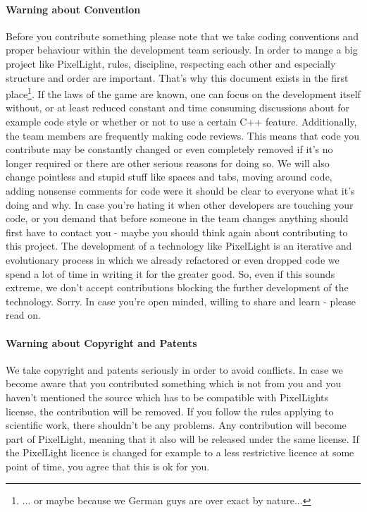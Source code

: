 \paragraph{Warning about Convention}
Before you contribute something please note that we take coding conventions and proper behaviour within the development team seriously. In order to mange a big project like PixelLight, rules, discipline, respecting each other and especially structure and order are important. That's why this document exists in the first place\footnote{... or maybe because we German guys are over exact by nature...}. If the laws of the game are known, one can focus on the development itself without, or at least reduced constant and time consuming discussions about for example code style or whether or not to use a certain C++ feature. Additionally, the team members are frequently making code reviews. This means that code you contribute may be constantly changed or even completely removed if it's no longer required or there are other serious reasons for doing so. We will also change pointless and stupid stuff like spaces and tabs, moving around code, adding nonsense comments for code were it should be clear to everyone what it's doing and why. In case you're hating it when other developers are touching your code, or you demand that before someone in the team changes anything should first have to contact you - maybe you should think again about contributing to this project. The development of a technology like PixelLight is an iterative and evolutionary process in which we already refactored or even dropped code we spend a lot of time in writing it for the greater good. So, even if this sounds extreme, we don't accept contributions blocking the further development of the technology. Sorry. In case you're open minded, willing to share and learn - please read on.


\paragraph{Warning about Copyright and Patents}
We take copyright and patents seriously in order to avoid conflicts. In case we become aware that you contributed something which is not from you and you haven't mentioned the source which has to be compatible with PixelLights license, the contribution will be removed. If you follow the rules applying to scientific work, there shouldn't be any problems. Any contribution will become part of PixelLight, meaning that it also will be released under the same license. If the PixelLight licence is changed for example to a less restrictive licence at some point of time, you agree that this is ok for you.


